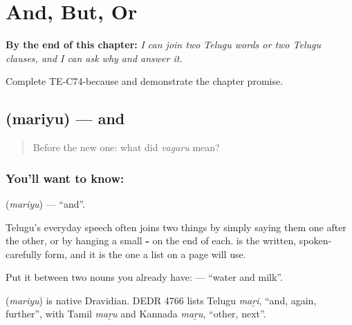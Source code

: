 
\chapter{And, But, Or}
\label{ch:te-and-but-or}

\begin{chapteropening}
\textbf{By the end of this chapter:} \emph{I can join two Telugu words or two Telugu clauses, and I can ask why and answer it.}

Complete TE-C74-because and demonstrate the chapter promise.
\end{chapteropening}

\section[\texorpdfstring{\te{మరియు} (mariyu)}{మరియు (mariyu)}]{ (mariyu) — and}

\label{lesson:TE-C74-and}



\begin{quote}
Before the new one: what did \emph{vagaru} mean?
\end{quote}

\subsection*{You'll want to know: }
\textbf{} (\emph{mariyu}) — \textquotedblleft{}and\textquotedblright{}.

Telugu's everyday speech often joins two things by simply saying them one after the other, or by hanging a small \textbf{-} on the end of each.  is the written, spoken-carefully form, and it is the one a list on a page will use.

Put it between two nouns you already have: \textbf{  } — \textquotedblleft{}water and milk\textquotedblright{}.

\begin{cousinweb}
\textbf{} (\emph{mariyu}) is native Dravidian. DEDR 4766 lists Telugu \emph{maṟi}, \textquotedblleft{}and, again, further\textquotedblright{}, with Tamil \emph{maṟu} and Kannada \emph{maṟu}, \textquotedblleft{}other, next\textquotedblright{}.
\end{cousinweb}

